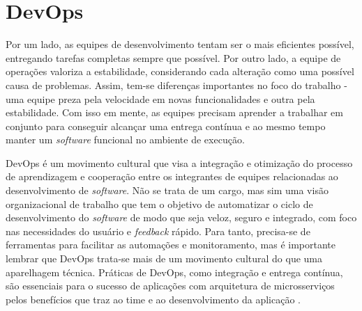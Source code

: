 
\section{DevOps}

Por um lado, as equipes de desenvolvimento tentam ser o mais eficientes possível, entregando tarefas completas sempre que possível. Por outro lado, a equipe de operações valoriza a estabilidade, considerando cada alteração como uma possível causa de problemas. Assim, tem-se diferenças importantes no foco do trabalho - uma equipe preza pela velocidade em novas funcionalidades e outra pela estabilidade. Com isso em mente, as equipes precisam aprender a trabalhar em conjunto para conseguir alcançar uma entrega contínua e ao mesmo tempo manter um \emph{software} funcional no ambiente de execução.

DevOps é um movimento cultural que visa a integração e otimização do processo de aprendizagem e cooperação entre os integrantes de equipes relacionadas ao desenvolvimento de \emph{software}. Não se trata de um cargo, mas sim uma visão organizacional de trabalho que tem o objetivo de automatizar o ciclo de desenvolvimento do \emph{software} de modo que seja veloz, seguro e integrado, com foco nas necessidades do usuário e \emph{feedback} rápido. Para tanto, precisa-se de ferramentas para facilitar as automações e monitoramento, mas é importante lembrar que DevOps trata-se mais de um movimento cultural do que uma aparelhagem técnica. Práticas de DevOps, como integração e entrega contínua, são essenciais para o sucesso de aplicações com arquitetura de microsserviços pelos benefícios que traz ao time e ao desenvolvimento da aplicação \cite{gitlab-devops}.


